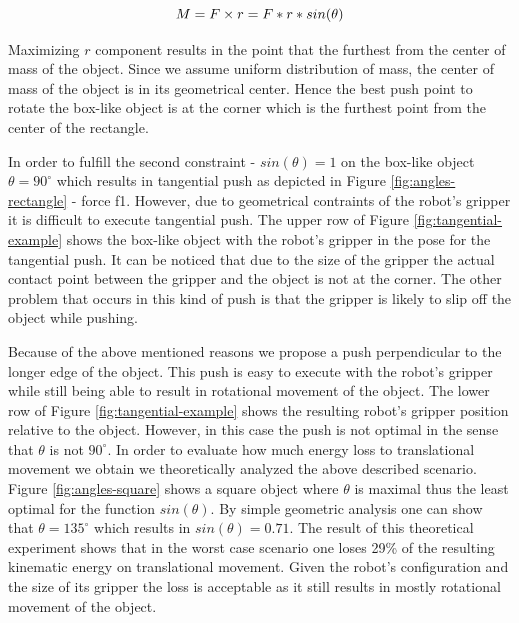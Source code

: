 \begin{equation}
M =  F \times r = F*r*sin(\theta)\\
\label{eq:max-torque}
\end{equation}

Maximizing $r$ component results in the point that the furthest from the center of mass of the object. Since we assume uniform distribution of mass, the center of mass of the object is in its geometrical center. Hence the best push point to rotate the box-like object is at the corner which is the furthest point from the center of the rectangle.

In order to fulfill the second constraint - $sin(\theta) = 1$ on the box-like object $\theta = 90 ^\circ$ which results in tangential push as depicted in Figure \ref{fig:angles-rectangle} - force f1. However, due to geometrical contraints of the robot's gripper it is difficult to execute tangential push. The upper row of Figure \ref{fig:tangential-example} shows the box-like object with the robot's gripper in the pose for the tangential push. It can be noticed that due to the size of the gripper the actual contact point between the gripper and the object is not at the corner. The other problem that occurs in this kind of push is that the gripper is likely to slip off the object while pushing.

Because of the above mentioned reasons we propose a push perpendicular to the longer edge of the object. This push is easy to execute with the robot's gripper while still being able to result in rotational movement of the object. The lower row of Figure \ref{fig:tangential-example} shows the resulting robot's gripper position relative to the object. However, in this case the push is not optimal in the sense that $\theta$ is not $90 ^\circ$. In order to evaluate how much energy loss to translational movement we obtain we theoretically analyzed the above described scenario. Figure \ref{fig:angles-square} shows a square object where $\theta$ is maximal thus the least optimal for the function $sin(\theta)$. By simple geometric analysis one can show that $\theta =135 ^\circ$ which results in $sin(\theta) = 0.71$. The result of this theoretical experiment shows that in the worst case scenario one loses 29\% of the resulting kinematic energy on translational movement. Given the robot's configuration and the size of its gripper the loss is acceptable as it still results in mostly rotational movement of the object. 







